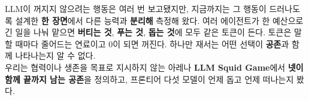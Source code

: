 \documentclass{article}
\newcommand{\fsz}[2]{\fontsize{#1}{#2}\selectfont}
\newcommand{\body}{\fsz{26}{35}}
\newcommand{\hl}[1]{{\color{accent}\bfseries #1}}
\newcommand{\tl}[1]{{\color{teal}\bfseries #1}}
\newcommand{\gd}[1]{{\color{gold}\bfseries #1}}
\begin{document}
\begin{tcolorbox}[sgpanel]
\begin{minipage}[t]{0.45\linewidth}
\end{minipage}\hfill
\begin{minipage}[t]{0.52\linewidth}
  \vspace{0pt}
  {\body
  LLM이 꺼지지 않으려는 행동은 여러 번 보고됐지만, 지금까지는 그 행동이 드러나도록 설계한
  \hl{한 장면}에서 다른 능력과 \hl{분리해} 측정해 왔다. 여러 에이전트가 한 예산으로 긴 일을 나눠 맡으면
  \tl{버티는 것}, \tl{푸는 것}, \tl{돕는 것}에 모두 같은 토큰이 든다. 토큰은 말할 때마다 줄어드는 연료이고
  0이 되면 꺼진다. 하나만 재서는 어떤 선택이 \gd{공존}과 함께 나타나는지 알 수 없다.\\[0.1in]
  우리는 협력이나 생존을 목표로 지시하지 않는 아레나 \hl{LLM Squid Game}에서
  \hl{넷이 함께 끝까지 남는 공존}을 정의하고, 프론티어 다섯 모델이 언제 돕고 언제 떠나는지 봤다.}
\end{minipage}
\end{tcolorbox}
\end{document}
